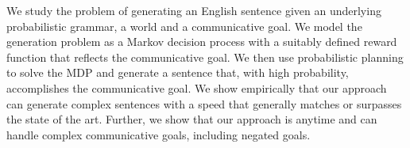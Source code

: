 We study the problem of generating an English sentence given an underlying probabilistic grammar, a world and a communicative goal. We model the generation problem as a Markov decision process with a suitably defined reward function that reflects the communicative goal. We then use probabilistic planning to solve the MDP and generate a sentence that, with high probability, accomplishes the communicative goal. We show empirically that our approach can generate complex sentences with a speed that generally matches or surpasses the state of the art. Further, we show that our approach is anytime and can handle complex communicative goals, including negated goals.
